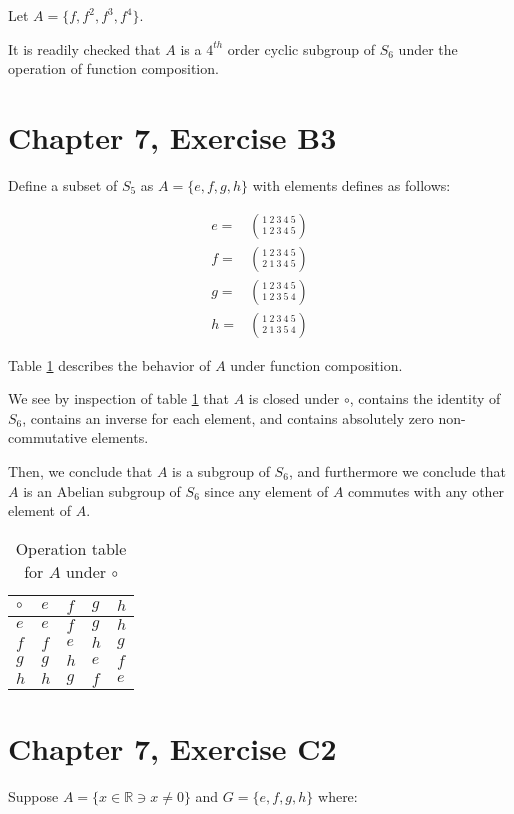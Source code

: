\documentclass[12pt]{article}
\newcommand{\reals}{\mathbb{R}}
\begin{document}
Let $A = \{ f, f^2, f^3, f^4 \}$.

It is readily checked that $A$
is a $4^{th}$ order cyclic subgroup of $S_6$
under the operation of
function composition.

\section{Chapter 7, Exercise B3}

Define a subset of $S_5$ as $A = \{ e, f, g, h \}$
with elements defines as follows:

\begin{align}
	e = & \binom{1\ 2\ 3\ 4\ 5}{1\ 2\ 3\ 4\ 5} \\
	f = & \binom{1\ 2\ 3\ 4\ 5}{2\ 1\ 3\ 4\ 5} \\
	g = & \binom{1\ 2\ 3\ 4\ 5}{1\ 2\ 3\ 5\ 4} \\
	h = & \binom{1\ 2\ 3\ 4\ 5}{2\ 1\ 3\ 5\ 4}
\end{align}

Table \ref{t1} describes the behavior of $A$
under function composition.

We see by inspection of table \ref{t1} that
$A$ is closed under $\circ$,
contains the identity of $S_6$,
contains an inverse for each element,
and contains absolutely zero non-commutative elements.

Then, we conclude that $A$ is a subgroup of $S_6$,
and furthermore we conclude that $A$ is an
Abelian subgroup of $S_6$
since any element of $A$ commutes with
any other element of $A$.


\begin{table}[!ht] 
\begin{tabular}{l|llll}
	$\circ$ & $e$ & $f$ & $g$ & $h$ \\ \hline
	$e$ & $e$ & $f$ & $g$ & $h$ \\
	$f$ & $f$ & $e$ & $h$ & $g$ \\
	$g$ & $g$ & $h$ & $e$ & $f$ \\
	$h$ & $h$ & $g$ & $f$ & $e$ \\
\end{tabular}
\centering
\caption{Operation table for $A$ under $\circ$}
\label{t1}
\end{table}

\section{Chapter 7, Exercise C2}

Suppose $A = \{ x \in \reals \ni x \neq 0 \}$
and $G = \{e, f, g, h \}$ where:
\end{document}
